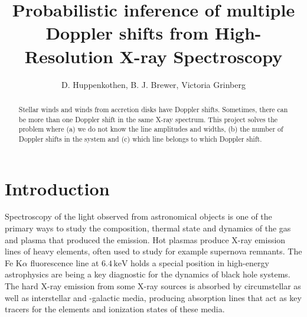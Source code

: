 \documentclass[12pt]{emulateapj}
\begin{document}
\title{Probabilistic inference of multiple Doppler shifts from High-Resolution X-ray Spectroscopy}

\author{D. Huppenkothen, B. J. Brewer, Victoria Grinberg}
 


\begin{abstract}
Stellar winds and winds from accretion disks have Doppler shifts. Sometimes, there can be more than one Doppler shift in 
the same X-ray spectrum. This project solves the problem where (a) we do not know the line amplitudes and widths, (b) the 
number of Doppler shifts in the system and (c) which line belongs to which Doppler shift.
\end{abstract}


\section{Introduction}


Spectroscopy of the light observed from astronomical objects is one of the primary ways to study the composition, thermal state and dynamics of the gas and plasma that produced the emission. Hot plasmas produce X-ray emission lines of heavy elements, often used to study for example supernova remnants. The Fe K$\alpha$ fluorescence line at $6.4 \, \mathrm{keV}$ holds a special position in high-energy astrophysics are being a key diagnostic for the dynamics of black hole systems. The hard X-ray emission from some X-ray sources is absorbed by circumstellar as well as interstellar and -galactic media, producing absorption lines that act as key tracers for the elements and ionization states of these media. 
\end{document}
